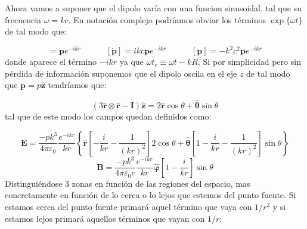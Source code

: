 \documentclass[12pt,a4paper]{article}
\newcommand{\ccorchetes}[1]{\left[ #1  \right]}
\newcommand{\tquad}{\quad \quad \quad}
\newcommand{\Bn}{\mathbf{B}}
\newcommand{\En}{\mathbf{E}}
\newcommand{\pn}{\mathbf{p}}
\newcommand{\In}{\mathbf{I}}
\newcommand{\hnr}{\hat{\mathbf{r}}}
\newcommand{\hnz}{\hat{\mathbf{z}}}
\newcommand{\hntheta}{\hat{\boldsymbol{\theta}}}
\newcommand{\hnvarphi}{\hat{\boldsymbol{\varphi}}}
\numberwithin{equation}{section}
\numberwithin{figure}{section}
\begin{document}
Ahora vamos a suponer que el dipolo varía con una funcion sinusoidal, tal que su frecuencia $\omega = k c$. En notación compleja podríamos obviar los términos $\exp \{ \omega t \}$ de tal modo que:

\begin{equation}
[\pn] = \pn e^{ - i k r } \tquad [\dot{\pn}] = i k c \pn e^{-ikr} \tquad [\ddot{\pn}] = - k^2 c^2 \pn e^{-ikr}
\end{equation}
donde aparece el término $-ikr$ ya que $\omega t_r \equiv \omega t - k R$. Si por simplicidad pero sin pérdida de información suponemos que el dipolo oscila en el eje $z$ de tal modo que $\pn = p \hnz$ tendríamos que:

\begin{equation}
(3 \hnr \otimes \hnr - \In) \hnz = 2 \hnr \cos \theta + \hntheta \sin \theta
\end{equation}
tal que de este modo los campos quedan definidos como:

\begin{equation}
\En = \dfrac{- p k^3}{4 \pi \varepsilon_0} \dfrac{e^{-ikr}}{kr} \left\lbrace \hnr \ccorchetes{-\frac{i}{kr}-\frac{1}{(kr)^2}}2 \cos \theta  + \hntheta \ccorchetes{1-\frac{i}{kr}-\frac{1}{(kr)^2}} \sin \theta \right\rbrace
\end{equation}
\begin{equation}
\Bn = \dfrac{- p k^3}{4 \pi \varepsilon_0c} \dfrac{e^{-ikr}}{kr} \hnvarphi \ccorchetes{1- \frac{i}{kr}} \sin \theta 
\end{equation}
Distinguiéndose 3 zonas en función de las regiones del espacio, mas concretamente en función de lo cerca o lo lejos que estemos del punto fuente. Si estamos cerca del punto fuente primará aquel término que vaya con $1/r^2$ y si estamos lejos primará aquellos términos que vayan con $1/r$:
\end{document}
